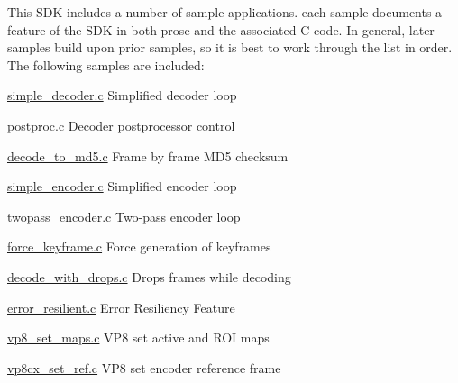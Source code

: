 This S\+D\+K includes a number of sample applications. each sample documents a feature of the S\+D\+K in both prose and the associated C code. In general, later samples build upon prior samples, so it is best to work through the list in order. The following samples are included\+:
\begin{DoxyItemize}
\item \hyperlink{example_simple_decoder}{simple\+\_\+decoder.\+c} Simplified decoder loop
\item \hyperlink{example_postproc}{postproc.\+c} Decoder postprocessor control
\item \hyperlink{example_decode_to_md5}{decode\+\_\+to\+\_\+md5.\+c} Frame by frame M\+D5 checksum
\item \hyperlink{example_simple_encoder}{simple\+\_\+encoder.\+c} Simplified encoder loop
\item \hyperlink{example_twopass_encoder}{twopass\+\_\+encoder.\+c} Two-\/pass encoder loop
\item \hyperlink{example_force_keyframe}{force\+\_\+keyframe.\+c} Force generation of keyframes
\item \hyperlink{example_decode_with_drops}{decode\+\_\+with\+\_\+drops.\+c} Drops frames while decoding
\item \hyperlink{example_error_resilient}{error\+\_\+resilient.\+c} Error Resiliency Feature
\item \hyperlink{example_vp8_set_maps}{vp8\+\_\+set\+\_\+maps.\+c} V\+P8 set active and R\+O\+I maps
\item \hyperlink{example_vp8cx_set_ref}{vp8cx\+\_\+set\+\_\+ref.\+c} V\+P8 set encoder reference frame
\end{DoxyItemize}

